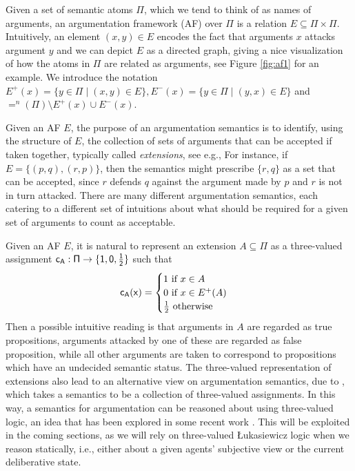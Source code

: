 \documentclass[greybox]{svmult}
\newcommand{\outa}[2]{#1^+(#2)}
\newcommand{\ina}[2]{#1^-(#2)}
\newcommand{\neu}[2]{#1^n(#2)}
\newcommand{\clab}{\sf c}
\begin{document}
Given a set of semantic atoms $\Pi$, which we tend to think of as names of arguments, an argumentation framework (AF) over $\Pi$ is a relation $E \subseteq \Pi \times \Pi$. Intuitively, an element $(x,y) \in E$ encodes the fact that arguments $x$ attacks argument $y$ and we can depict $E$ as a directed graph, giving a nice visualization of how the atoms in $\Pi$ are related as arguments, see Figure \ref{fig:af1} for an example. We introduce the notation $\outa E x = \{y \in \Pi \mid (x,y) \in E\}, \ina E x = \{y \in \Pi \mid (y,x) \in E\}$ and $\neu = \Pi \setminus \outa E x \cup \ina E x$.

Given an AF $E$, the purpose of an argumentation semantics is to identify, using the structure of $E$, the collection of sets of arguments that can be accepted if taken together, typically called \emph{extensions}, see e.g., \cite{....} For instance, if $E = \{(p,q),(r,p)\}$, then the semantics might prescribe $\{r,q\}$ as a set that can be accepted, since $r$ defends $q$ against the argument made by $p$ and $r$ is not in turn attacked. There are many different argumentation semantics, each catering to a different set of intuitions about what should be required for a given set of arguments to count as acceptable.

Given an AF $E$, it is natural to represent an extension $A \subseteq \Pi$ as a three-valued assignment $\clab_A:\Pi \to \three$ such that 
$$
\clab_A(x) = \begin{cases} 1 \text{ if } x \in A \\ 0 \text{ if } x \in \outa E A \\ \frac{1}{2} \text{ otherwise } \end{cases}
$$
Then a possible intuitive reading is that arguments in $A$ are regarded as true propositions, arguments attacked by one of these are regarded as false proposition, while all other arguments are taken to correspond to propositions which have an undecided semantic status. The three-valued representation of extensions also lead to an alternative view on argumentation semantics, due to \cite{camlab}, which takes a semantics to be a collection of three-valued assignments. In this way, a semantics for argumentation can be reasoned about using three-valued logic, an idea that has been explored in some recent work \cite{usSynthese,meESSLLI,Arieli}. This will be exploited in the coming sections, as we will rely on three-valued {\L}ukasiewicz logic when we reason statically, i.e., either about a given agents' subjective view or the current deliberative state.
\end{document}
